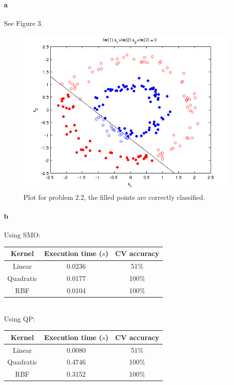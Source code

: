 \documentclass{article}
\begin{document}
\paragraph{a}
See Figure 3.
\begin{figure}
\begin{center}
\includegraphics[scale = 0.6]{pics/plot22.png}
\caption{ Plot for problem 2.2, the filled points are correctly classified.}
\end{center}
\end{figure}

\paragraph{b}

Using SMO:

\begin{tabular}{c | c | c}
  Kernel & Execution time ($s$)& CV accuracy\\
  \hline
  Linear & 0.0236 & 51\%\\
  Quadratic & 0.0177 & 100\%\\
  RBF & 0.0104 & 100\%
\end{tabular}\\

Using QP:

\begin{tabular}{c | c | c}
  Kernel & Execution time ($s$)& CV accuracy\\
  \hline
  Linear & 0.0080 & 51\%\\
  Quadratic & 0.4746 & 100\%\\
  RBF & 0.3152 & 100\%
\end{tabular}
\end{document}
